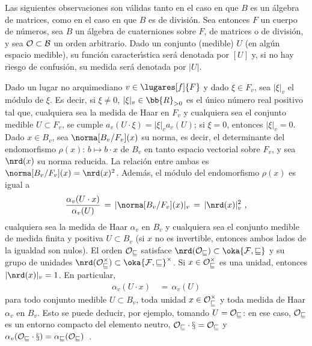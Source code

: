 Las siguientes observaciones son v\'{a}lidas tanto en el caso en que $B$ es un
\'{a}lgebra de matrices, como en el caso en que $B$ es de divisi\'{o}n. Sea
entonces $F$ un cuerpo de n\'{u}meros, sea $B$ un \'{a}lgebra de cuaterniones
sobre $F$, de matrices o de divisi\'{o}n, y sea $\cal{O}\subset B$ un orden
arbitrario. Dado un conjunto (medible) $U$ (en alg\'{u}n espacio medible),
su funci\'{o}n caracter\'{\i}stica ser\'{a} denotada por $[U]$ y, si no hay
riesgo de confusi\'{o}n, su medida ser\'{a} denotada por $|U|$.

Dado un lugar no arquimediano $v\in\lugares[f]{F}$ y dado $\xi\in F_{v}$, sea
$|\xi|_{v}$ el m\'{o}dulo de $\xi$. Es decir, si $\xi\not =0$,
$|\xi|_{v}\in\bb{R}_{>0}$ es el \'{u}nico n\'{u}mero real positivo tal que,
cualquiera sea la medida de Haar en $F_{v}$ y cualquiera sea el conjunto
medible $U\subset F_{v}$, se cumple $a_{v}(U\cdot \xi)=|\xi|_{v}a_{v}(U)$;
si $\xi=0$, entonces $|\xi|_{v}=0$. Dado $x\in B_{v}$, sea
$\norma[B_{v}/F_{v}](x)$ su norma, es decir, el determinante del endomorfismo
$\rho(x):\,b\mapsto b\cdot x$ de $B_{v}$ en tanto espacio vectorial sobre
$F_{v}$, y sea $\nrd(x)$ su norma reducida. La relaci\'{o}n entre ambas es
$\norma[B_{v}/F_{v}](x)=\nrd(x)^{2}$. Adem\'{a}s, el m\'{o}dulo del
endomorfismo $\rho(x)$ es igual a
\begin{equation}
	\label{eq:modulodeunelementodelalgebra}
	\frac{\alpha_{v}(U\cdot x)}{\alpha_{v}(U)} \,=\,
		|\norma[B_{v}/F_{v}](x)|_{v}\,=\,|\nrd(x)|_{v}^{2}
	\text{ ,}
\end{equation}
%
cualquiera sea la medida de Haar $\alpha_{v}$ en $B_{v}$ y cualquiera sea el
conjunto medible de medida finita y positiva $U\subset B_{v}$ (si $x$ no es
invertible, entonces ambos lados de la igualdad son nulos). El orden
$\cal{O}_{v}$ satisface $\nrd(\cal{O}_{v})\subset\oka{F,v}$ y su grupo de
unidades $\nrd(\cal{O}_{v}^{\times})\subset\oka{F,v}^{\times}$. Si
$x\in\cal{O}_{v}^{\times}$ es una unidad, entonces $|\nrd(x)|_{v}=1$.
En particular,
\begin{align*}
	\alpha_{v}(U\cdot x) & \,=\, \alpha_{v}(U)
\end{align*}
%
para todo conjunto medible $U\subset B_{v}$, toda unidad
$x\in\cal{O}_{v}^{\times}$ y toda medida de Haar $\alpha_{v}$ en $B_{v}$.
Esto se puede deducir, por ejemplo, tomando $U=\cal{O}_{v}$: en ese caso,
$\cal{O}_{v}$ es un entorno compacto del elemento neutro,
$\cal{O}_{v}\cdot x=\cal{O}_{v}$ y
\begin{math}
	\alpha_{v}(\cal{O}_{v}\cdot x)=\alpha_{v}(\cal{O}_{v})
\end{math}~.
